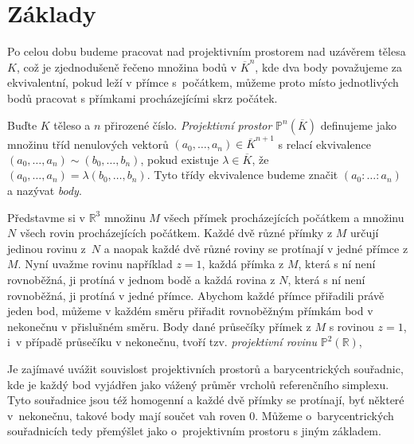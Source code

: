 \documentclass[12pt]{report}
\begin{document}
\section{Základy}


Po celou dobu budeme pracovat nad projektivním prostorem nad uzávěrem tělesa $K$, což je zjednodušeně řečeno množina bodů v $\overline{K}^n$, kde dva body považujeme za ekvivalentní, pokud leží v přímce s~počátkem, můžeme proto místo jednotlivých bodů pracovat s přímkami procházejícími skrz počátek.
\begin{definice}
Buďte $K$ těleso a $n$ přirozené číslo. \textit{Projektivní prostor} $\mathbb{P}^n (\overline{K})$ definujeme jako množinu tříd nenulových vektorů $(a_0, \dots, a_n) \in \overline{K}^{n+1}$ s relací ekvivalence $(a_0, \dots, a_n) \sim (b_0, \dots, b_n)$, pokud existuje $\lambda \in \overline{K}$, že $(a_0, \dots, a_n) = \lambda (b_0, \dots, b_n)$. Tyto třídy ekvivalence budeme značit $(a_0 : \dots : a_n)$ a nazývat \textit{body}.
\end{definice}

Představme si v $\mathbb{R}^3$ množinu $M$ všech přímek procházejících počátkem a množinu $N$ všech rovin procházejících počátkem. Každé dvě různé přímky z $M$ určují jedinou rovinu z~$N$ a naopak každé dvě různé roviny se protínají v jedné přímce z $M$. Nyní uvažme rovinu například $z=1$, každá přímka z $M$, která s ní není rovnoběžná, ji protíná v jednom bodě a každá rovina z $N$, která s ní není rovnoběžná, ji protíná v jedné přímce. Abychom každé přímce přiřadili právě jeden bod, můžeme v každém směru přiřadit rovnoběžným přímkám bod v nekonečnu v přislušném směru. Body dané průsečíky přímek z $M$ s rovinou $z=1$, i~v případě průsečíku v nekonečnu, tvoří tzv. \textit{projektivní rovinu} $\mathbb{P}^2 (\mathbb{R})$,

\begin{poznamka}
Je zajímavé uvážit souvislost projektivních prostorů a barycentrických souřadnic, kde je každý bod vyjádřen jako vážený průměr vrcholů referenčního simplexu. Tyto souřadnice jsou též homogenní a každé dvě přímky se protínají, byť některé v~nekonečnu, takové body mají součet vah roven $0$. Můžeme o~barycentrických souřadnicích tedy přemýšlet jako o~projektivním prostoru s jiným základem.
\end{poznamka}
\end{document}
